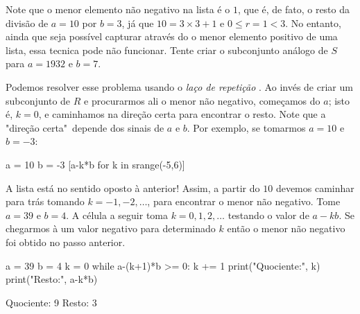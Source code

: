 Note que o menor elemento não negativo na lista
é o $1$, que é, de fato, o resto da divisão de $a = 10$ por
$b = 3$, já que $10 = 3\times 3 + 1$ e $0\leq r = 1 < 3$.
No entanto, ainda que seja possível capturar através
do \Sage o menor elemento positivo de uma lista, essa
tecnica pode não funcionar. Tente criar o subconjunto
análogo de $S$ para $a = 1932$ e $b = 7$.

Podemos resolver esse problema usando o \emph{laço
de repetição} . Ao invés
de criar um subconjunto de $R$ e procurarmos ali
o menor não negativo, começamos do $a$; isto é, $k = 0$,
e caminhamos na direção certa para encontrar
o resto. Note que a "direção  certa"\ depende
dos sinais de $a$ e $b$. Por exemplo, se
tomarmos $a = 10$ e $b = -3$:

\begin{sageinput}
a = 10                                                                                             
b = -3                                                                                             
[a-k*b for k in srange(-5,6)]                                                                      
\end{sageinput}
\begin{sageoutput}
[-5, -2, 1, 4, 7, 10, 13, 16, 19, 22, 25]
\end{sageoutput}
\noindent A lista está no sentido oposto à anterior! Assim, a partir
do $10$ devemos caminhar para trás tomando 
$k =-1,-2, \dots$, para encontrar o menor não negativo.
Tome $a = 39$ e $b = 4$. A célula a seguir
toma $k = 0, 1, 2, \dots$ testando o valor de $a-kb$. 
Se chegarmos à um valor negativo para determinado
$k$ então o menor não negativo foi obtido no passo anterior.
\begin{sageinput}
a = 39
b = 4
k = 0
while a-(k+1)*b >= 0:
  k += 1
print("Quociente:", k)
print("Resto:", a-k*b)
\end{sageinput}
\begin{sageoutput}
Quociente: 9
Resto:  3
\end{sageoutput}



